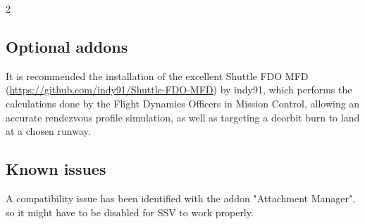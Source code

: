 \documentclass[Space_Shuttle_Vessel_Manual.tex]{subfiles}
\begin{document}
\begin{multicols*}{2}

\subsection{Optional addons}
It is recommended the installation of the excellent Shuttle FDO MFD (\url{https://github.com/indy91/Shuttle-FDO-MFD}) by indy91, which performs the calculations done by the Flight Dynamics Officers in Mission Control, allowing an accurate rendezvous profile simulation, as well as targeting a deorbit burn to land at a chosen runway.\\

\subsection{Known issues}
A compatibility issue has been identified with the addon "Attachment Manager", so it might have to be disabled for SSV to work properly.
\end{multicols*}
\end{document}

